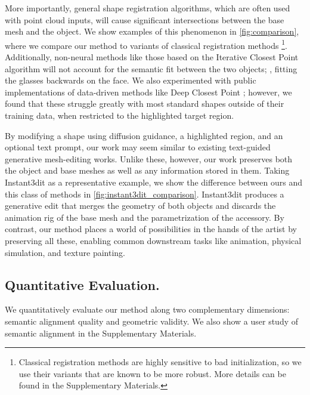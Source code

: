 

More importantly, general shape registration algorithms, which are often used with point cloud inputs, will cause significant intersections between the base mesh and the object.
We show examples of this phenomenon in \autoref{fig:comparison}, where we compare our method to variants of classical registration methods \cite{besl1992method}\footnote{\label{fn:alignment_baseline}Classical registration methods are highly sensitive to bad initialization, so we use their variants that are known to be more robust. More details can be found in the Supplementary Materials.}.
Additionally, non-neural methods like those based on the Iterative Closest Point algorithm will not account for the semantic fit between the two objects; \eg, fitting the glasses backwards on the face.
We also experimented with public implementations of data-driven methods like Deep Closest Point \cite{wang2019dcp}; however, we found that these struggle greatly with most standard shapes outside of their training data, when restricted to the highlighted target region.

By modifying a shape using diffusion guidance, a highlighted region, and an optional text prompt, our work may seem similar to existing text-guided generative mesh-editing works.
Unlike these, however, our work preserves both the object and base meshes as well as any information stored in them.
Taking Instant3dit \cite{barda2025instant3dit} as a representative example, we show the difference between ours and this class of methods in \autoref{fig:instant3dit_comparison}.
Instant3dit produces a generative edit that merges the geometry of both objects and discards the animation rig of the base mesh and the parametrization of the accessory.
By contrast, our method places a world of possibilities in the hands of the artist by preserving all these, enabling common downstream tasks like animation, physical simulation, and texture painting.




\subsection{Quantitative Evaluation.}
We quantitatively evaluate our method along two complementary dimensions: semantic alignment quality and geometric validity. We also show a user study of semantic alignment in the Supplementary Materials.\\

